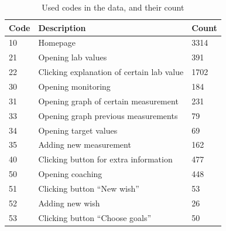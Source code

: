 \begin{table}[!h]
	\centering
	\caption{Used codes in the data, and their count}
	\label{table:codes}
	\begin{tabular}{@{}lll@{}}
		\toprule
		\textbf{Code} & \textbf{Description}                                                                              & \textbf{Count} \\ \midrule
		10            & Homepage                                                                                          & 3314           \\
		21            & Opening lab values                                                                                & 391            \\
		22            & Clicking explanation of certain lab value                                                         & 1702           \\
		30            & Opening monitoring                                                                                & 184            \\
		31            & Opening graph of certain measurement                                                              & 231            \\
		33            & Opening graph previous measurements                                                               & 79             \\
		34            & Opening target values                                                                             & 69             \\
		35            & Adding new measurement                                                                            & 162            \\
		40            & Clicking button for extra information                                                             & 477            \\
		50            & Opening coaching                                                                                  & 448            \\
		51            & Clicking button “New wish”                                                                        & 53             \\
		52            & Adding new wish                                                                                   & 26             \\
		53            & Clicking button “Choose goals”                                                                    & 50             \\

\end{tabular}
\end{table}
